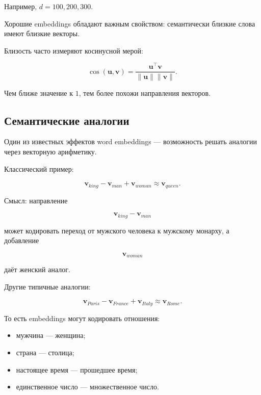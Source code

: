 \documentclass[a4paper,12pt]{article}
\begin{document}
Например, \(d = 100, 200, 300\).

Хорошие embeddings обладают важным свойством: семантически близкие слова имеют близкие векторы.

Близость часто измеряют косинусной мерой:

\[
\cos(\bm{u}, \bm{v})
=
\frac{\bm{u}^\top \bm{v}}
{\|\bm{u}\| \|\bm{v}\|}.
\]

Чем ближе значение к \(1\), тем более похожи направления векторов.

\subsection{Семантические аналогии}

Один из известных эффектов word embeddings --- возможность решать аналогии через векторную арифметику.

Классический пример:

\[
\bm{v}_{king} - \bm{v}_{man} + \bm{v}_{woman}
\approx
\bm{v}_{queen}.
\]

Смысл: направление

\[
\bm{v}_{king} - \bm{v}_{man}
\]

может кодировать переход от мужского человека к мужскому монарху, а добавление

\[
\bm{v}_{woman}
\]

даёт женский аналог.

Другие типичные аналогии:

\[
\bm{v}_{Paris} - \bm{v}_{France} + \bm{v}_{Italy}
\approx
\bm{v}_{Rome}.
\]

То есть embeddings могут кодировать отношения:

\begin{itemize}
    \item мужчина --- женщина;
    \item страна --- столица;
    \item настоящее время --- прошедшее время;
    \item единственное число --- множественное число.
\end{itemize}

%
\end{document}
